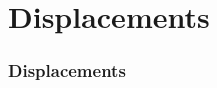 \section[Displacements]{Displacements}

\graphicspath{{Chapter5/Figs/Vector/}{Chapter4/Figs/Vector/}}

\begin{frame}
  \frametitle{Displacements}
  \framesubtitle{}
  \label{fr6:terr_sat_ext}

\end{frame}
\note{}
